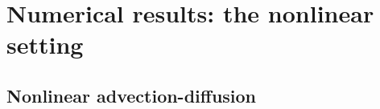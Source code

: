 \documentclass[review]{siamart}
\begin{document}
\section{Numerical results: the nonlinear setting}\label{sec:numerics_nonlin}

\subsection{Nonlinear advection-diffusion}\label{sec:numerics_nonlin:advdiff}



\end{document}
